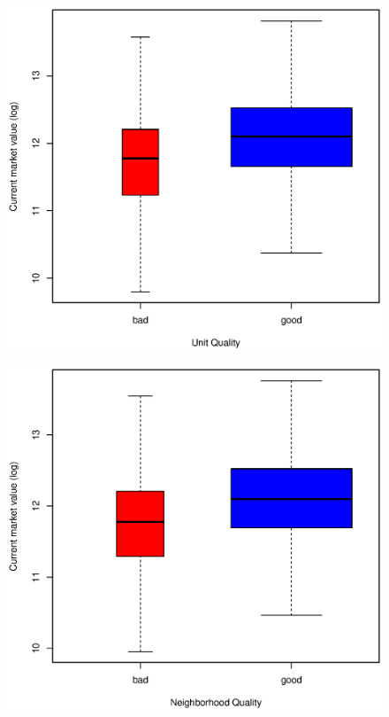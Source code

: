 \documentclass[11pt, fleqn]{article}
\begin{document}
\begin{figure}[!htb]
  \centering
  \includegraphics[scale=.5]{howh.eps}
  \caption{}
  \label{fig:howh}
\end{figure}

\begin{figure}[!htb]
  \centering
  \includegraphics[scale=.5]{hown.eps}
  \caption{}
  \label{fig:hown}
\end{figure}
\end{document}
